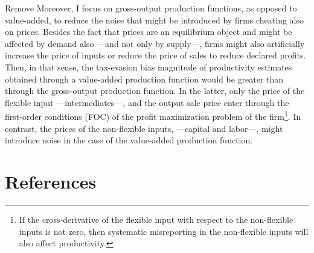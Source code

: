\documentclass[
  12pt]{article}
\begin{document}
\begin{anfxnote}{Remove}
Moreover, I focus on gross-output production functions, as opposed to
value-added, to reduce the noise that might be introduced by firms
cheating also on prices. Besides the fact that prices are an equilibrium
object and might be affected by demand also ---and not only by
supply---, firms might also artificially increase the price of inputs or
reduce the price of sales to reduce declared profits. Then, in that
sense, the tax-evasion bias magnitude of productivity estimates obtained
through a value-added production function would be greater than through
the gross-output production function. In the latter, only the price of
the flexible input ---intermediates---, and the output sale price enter
through the first-order conditions (FOC) of the profit maximization
problem of the firm\footnote{If the cross-derivative of the flexible
  input with respect to the non-flexible inputs is not zero, then
  systematic misreporting in the non-flexible inputs will also affect
  productivity.}. In contrast, the prices of the non-flexible inputs,
---capital and labor---, might introduce noise in the case of the
value-added production function.

\end{anfxnote}

\section{References}\label{references}

\renewcommand{\bibsection}{}

\end{document}
